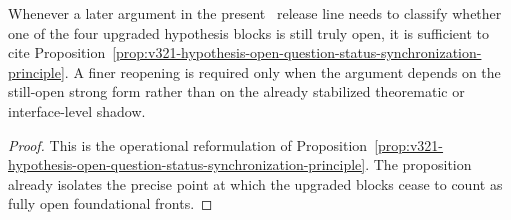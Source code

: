 \begin{corollary}
\label{cor:use-rule-for-the-synchronized-v321-status-reading}
Whenever a later argument in the present \docversion\ release line needs to classify whether one of the four upgraded hypothesis blocks is still truly open, it is sufficient to cite Proposition~\ref{prop:v321-hypothesis-open-question-status-synchronization-principle}. A finer reopening is required only when the argument depends on the still-open strong form rather than on the already stabilized theorematic or interface-level shadow.
\end{corollary}

\begin{proof}
This is the operational reformulation of Proposition~\ref{prop:v321-hypothesis-open-question-status-synchronization-principle}. The proposition already isolates the precise point at which the upgraded blocks cease to count as fully open foundational fronts.
\end{proof}



